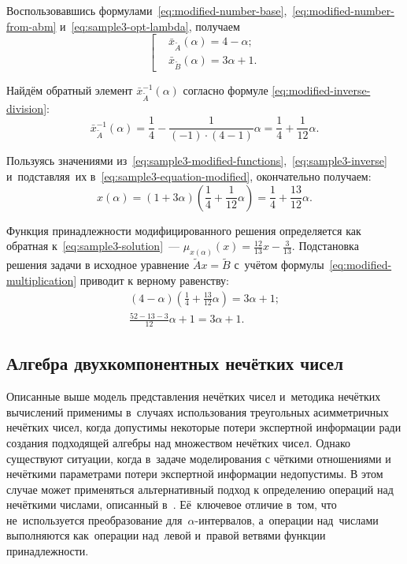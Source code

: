 Воспользовавшись формулами~\eqref{eq:modified-number-base},~\eqref{eq:modified-number-from-abm} и~\eqref{eq:sample3-opt-lambda}, получаем
\begin{equation}
\label{eq:sample3-modified-functions}
  \left[ \begin{aligned}
    & \bar{x}_{\tilde A}\left( \alpha  \right)=4-\alpha;  \\ 
    & \bar{x}_{\tilde B}\left( \alpha  \right)=3\alpha+1.
  \end{aligned} \right.
\end{equation}

Найдём обратный элемент $\bar{x}_{\tilde A}^{-1}\left( \alpha  \right)$ согласно формуле \eqref{eq:modified-inverse-division}: 
\begin{equation}
\label{eq:sample3-inverse}
  \bar{x}_{\tilde A}^{-1}\left(\alpha \right)=\frac{1}{4}-\frac{1}{\left( -1 \right)\cdot \left( 4-1 \right)}\alpha =\frac{1}{4}+\frac{1}{12}\alpha.\end{equation}

Пользуясь значениями из~\eqref{eq:sample3-modified-functions},~\eqref{eq:sample3-inverse} и~подставляя~их в~\eqref{eq:sample3-equation-modified}, окончательно получаем:
\begin{equation}
\label{eq:sample3-solution}
  x\left( \alpha  \right)=\left( 1+3\alpha  \right)\left( \frac{1}{4}+\frac{1}{12}\alpha  \right)=\frac{1}{4}+\frac{13}{12}\alpha.
\end{equation}

Функция принадлежности модифицированного решения определяется как обратная к~\eqref{eq:sample3-solution}~--- $\displaystyle \mu_{x\left(\alpha \right)}\left(x \right)=\frac{12}{13}x-\frac{3}{13}$. Подстановка решения задачи в исходное уравнение $\tilde{A}x=\tilde{B}$ с~учётом формулы~\eqref{eq:modified-multiplication} приводит к верному равенству:
\begin{gather*}
  \left( 4-\alpha  \right)\left( \frac{1}{4}+\frac{13}{12}\alpha  \right)=3\alpha +1; \\
  \frac{52-13-3}{12}\alpha +1=3\alpha +1.  
\end{gather*}

\subsection{Алгебра двухкомпонентных нечётких чисел}

Описанные выше модель представления нечётких чисел и~методика нечётких вычислений применимы в~случаях использования треугольных асимметричных нечётких чисел, когда допустимы некоторые потери экспертной информации ради создания подходящей алгебры над множеством нечётких чисел. Однако существуют ситуации, когда в~задаче моделирования с чёткими отношениями и нечёткими параметрами потери экспертной информации недопустимы. В этом случае может применяться альтернативный подход к определению операций над нечёткими числами, описанный в~\cite{Kanischeva}. Её~ключевое отличие в~том, что не~используется преобразование для~$\alpha$-интервалов, а~операции над~числами выполняются как~операции над~левой и~правой ветвями функции принадлежности.

